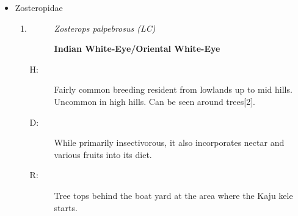\begin{itemize}
\begin{enumerate}
\begin{description}
\textbf{Orange{-}headed Thrush}%
\end{description}%
\begin{description}%
\item[H: ]%
Rare winter migrant to lowlands and lower hills. Prefers Forest,scrub and well wooded gardens with undercover{[}2{]}.%
\item[D: ]%
A wide variety of invertebrates, such as earthworms, insects, spiders, snails, and leeches. It also consumes various berries, soft fruits, and fallen figs.%
\item[R: ]%
Single sighting of a pair at Kaju kele.%
\end{description}%
\end{enumerate}%
\item%
Zosteropidae%
\begin{enumerate}%
\item%
\begin{description}%
\item[]%
\textit{Zosterops palpebrosus (LC)}%
\item[]%
\textbf{Indian White{-}Eye/Oriental White{-}Eye}%
\end{description}%
\begin{description}%
\item[H: ]%
Fairly common breeding resident from lowlands up to mid hills. Uncommon in high hills. Can be seen around trees{[}2{]}.%
\item[D: ]%
While primarily insectivorous, it also incorporates nectar and various fruits into its diet.%
\item[R: ]%
Tree tops behind the boat yard at the area where the Kaju kele starts.%
\end{description}%
\end{enumerate}%
\end{itemize}
